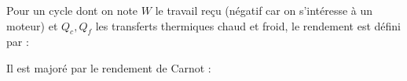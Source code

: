 ﻿\documentclass[a4paper]{article}
\begin{document}
\pagestyle{fancy}
\fancyhf{}
\setlength{\headheight}{15pt}

\begin{center}
	\large{}
\end{center}


Pour un cycle dont on note \(W\) le travail reçu (négatif car on s'intéresse à un moteur) et \(Q_c,Q_f\) les transferts thermiques chaud et froid, le rendement est défini par :\begin{center}
\end{center}
Il est majoré par le rendement de Carnot :\begin{center}\end{center}
\end{document}
